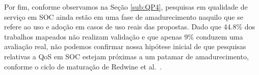 Por fim, conforme observamos na Seção \ref{sub:QP4}, pesquisas em qualidade de servi\c co em SOC ainda est\~{a}o em uma fase de amadurecimento naquilo que se refere ao uso e adoção em casos de uso reais das propostas. Dado que 44.8\% dos trabalhos mapeados n\~{a}o realizam validação e que apenas 9\% conduzem uma avaliação real, não podemos confirmar nossa hipótese inicial de que pesquisas 
relativas a QoS em SOC estejam próximas a um patamar de amadurecimento, conforme o ciclo de maturação de Redwine et al.~\cite{redwine:icse1985}.
